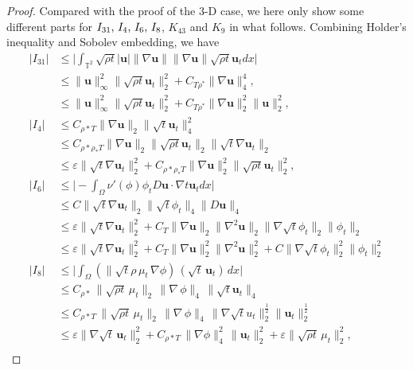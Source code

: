 \documentclass[11pt]{article}
\numberwithin{equation}{section}
\begin{document}
\begin{proof}
Compared with the proof of the 3-D case, we here only show some different parts for \(I_{31}$, $I_4$, $I_6$, $I_8 \), \( K_{43} \) and \( K_{9} \) in what follows. Combining Holder's inequality and Sobolev embedding, we have
\begin{align*}
|I_{31}| &\leq \big|\int_{\mathbb{T}^2} \sqrt{\rho t} |\mathbf{u}| \|\nabla \mathbf{u}\| \|\nabla \mathbf{u}\| \sqrt{\rho t} \mathbf{u}_t dx\big| \\&\leq \|\mathbf{u}\|_{\infty}^2 \| \sqrt{\rho t} \mathbf{u}_t \|_2^2 + C _{T \rho^*} \| \nabla \mathbf{u} \|_4^4,\\
&\leq \|\mathbf{u}\|_{\infty}^2 \| \sqrt{\rho t} \mathbf{u}_t \|_2^2 + C_{ T \rho^*} \| \nabla \mathbf{u} \|_2^2\| \mathbf{u} \|_2^2,\\
|I_4| &\leq C_{\rho*T}\| \nabla \mathbf{u} \|_2 \| \sqrt{t} \mathbf{u}_t \|_4^2
\\& \leq C_{\rho*\rho_*T} \| \nabla \mathbf{u} \|_2 \| \sqrt{\rho t} \mathbf{u}_t \|_2 \| \sqrt{t} \nabla \mathbf{u}_t \|_2 \\ &\leq \varepsilon \| \sqrt{t} \nabla \mathbf{u}_t \|_2^2 + C_{\rho*\rho_*T} \| \nabla \mathbf{u} \|_2^2 \| \sqrt{\rho t} \mathbf{u}_t \|_2^2,\\
|I_6| &\leq \big|- \int _{\Omega}\nu'(\phi) \phi_t D \mathbf{u} \cdot \nabla t\mathbf{u}_t dx \big| \\&\leq C \| \sqrt{t} \nabla \mathbf{u}_t \|_2 \|\sqrt t \phi_t \|_4 \| D \mathbf{u} \|_4\\
&\leq \varepsilon \| \sqrt{t} \nabla \mathbf{u}_t \|_2^2 + C_T\| \nabla \mathbf{u} \|_2\| \nabla^2 \mathbf{u} \|_2 \|\nabla\sqrt t\phi_t \|_2\|\phi_t \|_2\\
&\leq \varepsilon \| \sqrt{t} \nabla \mathbf{u}_t \|_2^2 + C_T\| \nabla \mathbf{u} \|_2^2\| \nabla^2 \mathbf{u} \|_2^2+C \|\nabla\sqrt t\phi_t \|_2^2\|\phi_t \|_2^2\\
|I_8| &\leq \big| \int_{\Omega} ( \|\sqrt{t}\rho \, \mu_t \, \nabla \phi) \, (\sqrt{t} \, \mathbf{u}_t) \, dx \big|\\& \leq C_{\rho*} \, \|\sqrt{\rho t} \, \mu_t\|_2 \, \|\nabla \, \phi\|_4 \, \|\sqrt{t}\mathbf{u}_t\|_4\\
&\leq C_{\rho*T} \, \|\sqrt{\rho t} \, \mu_t\|_2 \, \|\nabla \, \phi\|_4 \, \|\nabla\sqrt{t}u_t\|_2^\frac{1}{2}\|\mathbf{u}_t\|_2^\frac{1}{2}\\& \leq \varepsilon\|\nabla \sqrt{t} \, \mathbf{u}_t\|_2^2 + C_{\rho*T} \, \|\nabla \phi\|_4^2 \, \|\mathbf{u}_t\|_2^2+\varepsilon\|\sqrt{\rho t} \, \mu_t\|_2^2,\\

\end{align*}
\end{proof}
\end{document}
